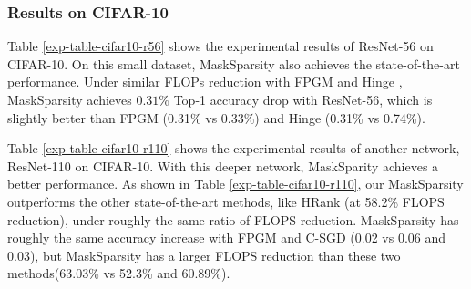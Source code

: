 \documentclass[review]{cvpr}
\begin{document}
 

\subsubsection{Results on CIFAR-10}\label{results_on_cifar10}

Table \ref{exp-table-cifar10-r56} shows the experimental results of ResNet-56 on CIFAR-10. On this small dataset, MaskSparsity also achieves the state-of-the-art performance. Under similar FLOPs reduction with FPGM \cite{FPGM} and Hinge \cite{Hinge}, MaskSparsity achieves $0.31\%$ Top-1 accuracy drop with ResNet-56, which is slightly better than FPGM \cite{FPGM} (0.31\% vs 0.33\%) and Hinge \cite{Hinge} (0.31\% vs 0.74\%).

Table \ref{exp-table-cifar10-r110} shows the experimental results of another network, ResNet-110 on CIFAR-10. With this deeper network, MaskSparity achieves a better performance. As shown in Table \ref{exp-table-cifar10-r110}, our MaskSparsity outperforms the other state-of-the-art methods, like HRank \cite{HRank} (at 58.2\% FLOPS reduction), under roughly the same ratio of FLOPS reduction. MaskSparsity has roughly the same accuracy increase with FPGM \cite{FPGM} and C-SGD \cite{CSGD} (0.02 vs 0.06 and 0.03), but MaskSparsity has a larger FLOPS reduction than these two methods(63.03\% vs 52.3\% and 60.89\%).
  







\end{document}
